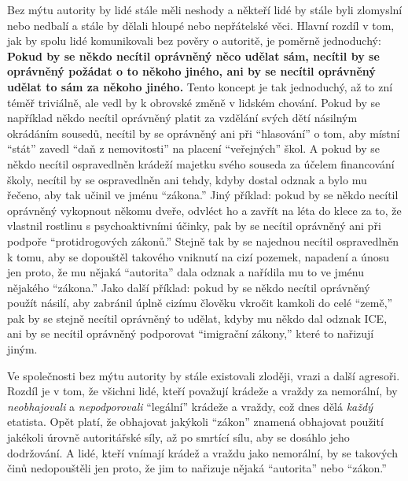 \documentclass{book}
\begin{document}
Bez mýtu autority by lidé stále měli neshody a někteří lidé by stále byli zlomyslní nebo nedbalí a stále by dělali hloupé nebo nepřátelské věci. Hlavní rozdíl v tom, jak by spolu lidé komunikovali bez pověry o autoritě, je poměrně jednoduchý: \textbf{Pokud by se někdo necítil oprávněný něco udělat sám, necítil by se oprávněný požádat o to někoho jiného, ani by se necítil oprávněný udělat to sám za někoho jiného.} Tento koncept je tak jednoduchý, až to zní téměř triviálně, ale vedl by k obrovské změně v lidském chování. Pokud by se například někdo necítil oprávněný platit za vzdělání svých dětí násilným okrádáním sousedů, necítil by se oprávněný ani při \enquote{hlasování} o tom, aby místní \enquote{stát} zavedl \enquote{daň z nemovitosti} na placení \enquote{veřejných} škol. A pokud by se někdo necítil ospravedlněn krádeží majetku svého souseda za účelem financování školy, necítil by se ospravedlněn ani tehdy, kdyby dostal odznak a bylo mu řečeno, aby tak učinil ve jménu \enquote{zákona.} Jiný příklad: pokud by se někdo necítil oprávněný vykopnout někomu dveře, odvléct ho a zavřít na léta do klece za to, že vlastnil rostlinu s psychoaktivními účinky, pak by se necítil oprávněný ani při podpoře \enquote{protidrogových zákonů.} Stejně tak by se najednou necítil ospravedlněn k tomu, aby se dopouštěl takového vniknutí na cizí pozemek, napadení a únosu jen proto, že mu nějaká \enquote{autorita} dala odznak a nařídila mu to ve jménu nějakého \enquote{zákona.} Jako další příklad: pokud by se někdo necítil oprávněný použít násilí, aby zabránil úplně cizímu člověku vkročit kamkoli do celé \enquote{země,} pak by se stejně necítil oprávněný to udělat, kdyby mu někdo dal odznak ICE, ani by se necítil oprávněný podporovat \enquote{imigrační zákony,} které to nařizují jiným.

Ve společnosti bez mýtu autority by stále existovali zloději, vrazi a další agresoři. Rozdíl je v tom, že všichni lidé, kteří považují krádeže a vraždy za nemorální, by \emph{neobhajovali} a \emph{nepodporovali} \enquote{legální} krádeže a vraždy, což dnes dělá \emph{každý} etatista. Opět platí, že obhajovat jakýkoli \enquote{zákon} znamená obhajovat použití jakékoli úrovně autoritářské síly, až po smrtící sílu, aby se dosáhlo jeho dodržování. A lidé, kteří vnímají krádež a vraždu jako nemorální, by se takových činů nedopouštěli jen proto, že jim to nařizuje nějaká \enquote{autorita} nebo \enquote{zákon.}
\end{document}
